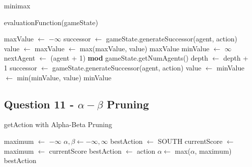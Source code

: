 \begin{algorithm}
\caption{minimax}
\begin{algorithmic}[1]
        \State \Return evaluationFunction(gameState)
    \EndIf
    
     
        \State maxValue $\gets$ $-\infty$
            \State successor $\gets$ gameState.generateSuccessor(agent, action)
            \State value $\gets$ 
            \State maxValue $\gets$ max(maxValue, value)
        \EndFor
        \State \Return maxValue
    \Else {}
        \State minValue $\gets$ $\infty$
        \State nextAgent $\gets$ (agent + 1) \textbf{mod} gameState.getNumAgents()
         
            \State depth $\gets$ depth + 1
        \EndIf
            \State successor $\gets$ gameState.generateSuccessor(agent, action)
            \State value $\gets$ 
            \State minValue $\gets$ min(minValue, value)
        \EndFor
        \State \Return minValue
    \EndIf
\EndFunction
\end{algorithmic}
\end{algorithm}

\pagebreak
\subsection{Question 11 - $\alpha - \beta$ Pruning}  

\begin{algorithm}
\caption{getAction with Alpha-Beta Pruning}
\begin{algorithmic}[1]
    \State maximum $\gets$ $-\infty$
    \State $\alpha, \beta \gets -\infty, \infty$
    \State bestAction $\gets$ SOUTH
        \State currentScore $\gets$ 
            \State maximum $\gets$ currentScore
            \State bestAction $\gets$ action
        \EndIf
        \State $\alpha \gets$ max($\alpha$, maximum)
    \EndFor
    \State \Return bestAction
\EndFunction
\end{algorithmic}
\end{algorithm}

